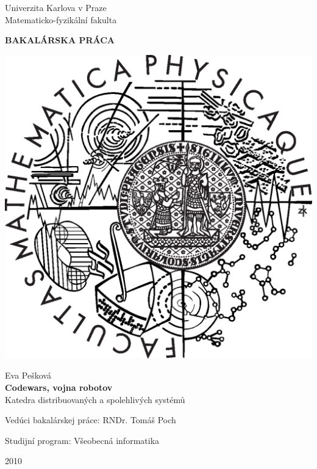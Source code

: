 \documentclass[12pt,notitlepage]{report}
\begin{document}
\begin{titlepage}
\begin{center}
\vspace{15mm}

\large
Univerzita Karlova v Praze\\
Matematicko-fyzikální fakulta\\

\vspace{5mm}

{\Large\bf BAKALÁRSKA PRÁCA}

\vspace{10mm}

\includegraphics[scale=0.3]{logo.eps} 

\vspace{15mm}

{\Large Eva Pešková}\\ %
\vspace{5mm}
{\Large\bf Codewars, vojna robotov }\\ %
\vspace{5mm}
Katedra distribuovaných a spolehlivých systémů
\vspace{15mm}

\large
\noindent Vedúci bakalárskej práce: RNDr. Tomáš Poch
\vspace{1mm} 

\noindent Studijní program: Všeobecná informatika %

\vspace{20mm}

2010
\end{center}
\end{titlepage}
\end{document}
